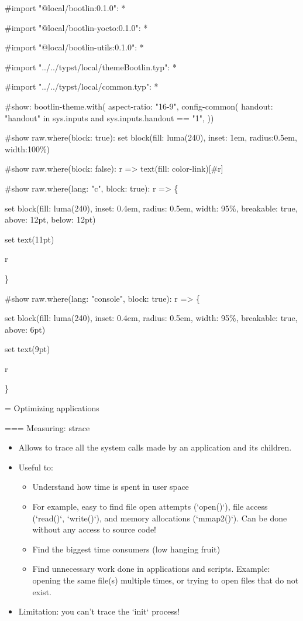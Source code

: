 #import "@local/bootlin:0.1.0": * 

#import "@local/bootlin-yocto:0.1.0": *

#import "@local/bootlin-utils:0.1.0": *

#import "../../typst/local/themeBootlin.typ": *

#import "../../typst/local/common.typ": *

#show: bootlin-theme.with(
  aspect-ratio: "16-9",
config-common(
  handout: "handout" in sys.inputs and sys.inputs.handout == "1",
))

#show raw.where(block: true): set block(fill: luma(240), inset: 1em, radius:0.5em, width:100\%) 

#show raw.where(block: false): r => { text(fill: color-link)[#r] } 

#show raw.where(lang: "c", block: true): r => \{

set block(fill: luma(240),
inset: 0.4em,
radius: 0.5em,
width: 95\%, breakable: true, above: 12pt, below: 12pt)

set text(11pt)

r

\} 


#show raw.where(lang: "console", block: true): r => \{

set block(fill: luma(240),
inset: 0.4em,
radius: 0.5em,
width: 95\%, breakable: true, above: 6pt)

set text(9pt)

r

\} 

 = Optimizing applications

=== Measuring: strace
\begin{itemize}
	\item Allows to trace all the system calls made by an
              application and its children.
	\item Useful to:
	\begin{itemize}
		\item Understand how time is spent in user space
		\item For example, easy to find file open attempts (`open()`),
		      file access (`read()`, `write()`), and
		      memory allocations (`mmap2()`). Can be done
		      without any access to source code!
		\item Find the biggest time consumers
		      (low hanging fruit)
		\item Find unnecessary work done in applications
		      and scripts. Example: opening the same file(s)
		      multiple times, or trying to open files that
		      do not exist.
	\end{itemize}
	\item Limitation: you can't trace the `init` process!
\end{itemize}



